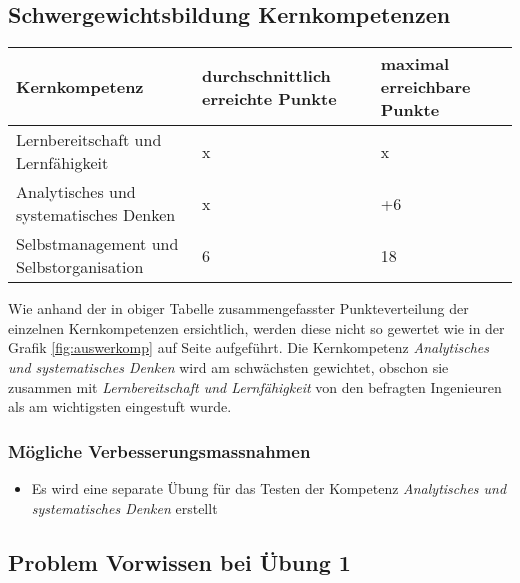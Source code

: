 \subsection{Schwergewichtsbildung Kernkompetenzen}
\begin{center}
  \begin{tabular}{ | p{7cm} | p{3cm} | p{3cm} |}
   \hline
   \textbf{Kernkompetenz} & \textbf{durchschnittlich erreichte Punkte} & \textbf{maximal erreichbare Punkte} \\ \hline
   Lernbereitschaft und Lernfähigkeit & x & x\\ \hline
   Analytisches und systematisches Denken & x & +6\\ \hline
   Selbstmanagement und Selbstorganisation & 6 & 18\\ \hline
  \end{tabular}
\end{center}
Wie anhand der in obiger Tabelle zusammengefasster Punkteverteilung der einzelnen Kernkompetenzen ersichtlich, werden diese nicht so gewertet wie in der Grafik \ref{fig:auswerkomp} auf Seite \pageref{fig:auswerkomp} aufgeführt. Die Kernkompetenz \textit{Analytisches und systematisches Denken} wird am schwächsten gewichtet, obschon sie zusammen mit \textit{Lernbereitschaft und Lernfähigkeit} von den befragten Ingenieuren als am wichtigsten eingestuft wurde.
\subsubsection{Mögliche Verbesserungsmassnahmen}
\begin{itemize}
\item Es wird eine separate Übung für das Testen der Kompetenz \textit{Analytisches und systematisches Denken} erstellt
\end{itemize}
\subsection{Problem Vorwissen bei Übung 1}
